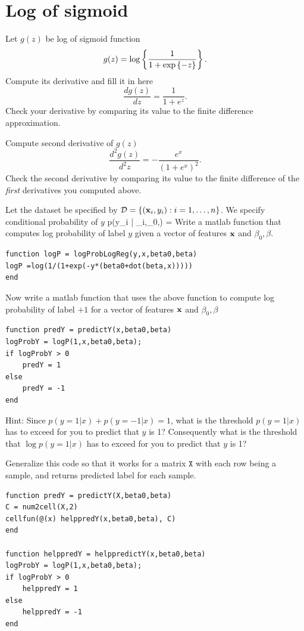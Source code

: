 \documentclass{article}
\begin{document}
\section*{Log of sigmoid}
\newproblem{0.5pt}
Let $g(z)$ be log of sigmoid function
\[
g(z) = \mathop{\rm log}\left\{ \frac{1}{1+ \mathop{\rm exp}\left\{-z\right\}} \right\}.
\]
Compute its derivative and fill it in here
\[
\frac{dg(z)}{dz} =  \frac{1}{1+e^z}.%
\]
Check your derivative by comparing its value to the finite difference approximation.


\newproblem{0.5pt}
Compute second derivative of $g(z)$
\[
\frac{d^2g(z)}{d^2z} =  -\frac{e^x}{(1+e^x)^2}.%
\]
Check the second derivative by comparing its value to the finite difference of the {\em first} derivatives you computed above.



\newproblem{0.5pt}
Let the dataset be specified by $\mathcal{D} = \left\{ (\mathbf{x}_i,y_i):i=1,\dots,n \right\}$. We specify conditional probability of $y$
\BEQ \label{eq:plr}
p(y_i | \xx_i,\beta_0,\beta) = 
\EEQ
Write a matlab function that computes log probability of label $y$ given a vector of features $\mathbf{x}$ and $\beta_0,\beta$.
\begin{verbatim}
function logP = logProbLogReg(y,x,beta0,beta)
logP =log(1/(1+exp(-y*(beta0+dot(beta,x)))))
end
\end{verbatim}
Now write a matlab function that uses the above function to compute log probability of label $+1$ for a vector of features $\mathbf{x}$ and $\beta_0,\beta$
\begin{verbatim}
function predY = predictY(x,beta0,beta)
logProbY = logP(1,x,beta0,beta);
if logProbY > 0
    predY = 1
else
    predY = -1
end
\end{verbatim}
Hint: Since $p(y=1|x) + p(y=-1|x) = 1$, what is the threshold $p(y=1|x)$ has to exceed for you to predict that $y$ is 1? Consequently what is the threshold
that $\log p(y=1|x)$  has to exceed for you to predict that $y$ is 1?

Generalize this code so that it works for a matrix $\texttt{X}$ with each row being a sample, and returns predicted label for each sample.
\begin{verbatim}
function predY = predictY(X,beta0,beta)
C = num2cell(X,2)
cellfun(@(x) helppredY(x,beta0,beta), C)
end

function helppredY = helppredictY(x,beta0,beta)
logProbY = logP(1,x,beta0,beta);
if logProbY > 0
    helppredY = 1
else
    helppredY = -1
end
\end{verbatim}
\end{document}
